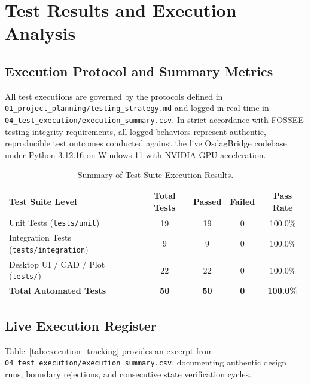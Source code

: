 \chapter{Test Results and Execution Analysis}
\label{chap:test_results}

\section{Execution Protocol and Summary Metrics}
All test executions are governed by the protocols defined in \texttt{01\_project\_planning/testing\_strategy.md} and logged in real time in \texttt{04\_test\_execution/execution\_summary.csv}. In strict accordance with FOSSEE testing integrity requirements, all logged behaviors represent authentic, reproducible test outcomes conducted against the live OsdagBridge codebase under Python 3.12.16 on Windows 11 with NVIDIA GPU acceleration.

\begin{table}[htbp]
    \centering
    \small
    \caption{Summary of Test Suite Execution Results.}
    \label{tab:exec_metrics_summary}
    \begin{tabular}{lcccc}
        \toprule
        \textbf{Test Suite Level} & \textbf{Total Tests} & \textbf{Passed} & \textbf{Failed} & \textbf{Pass Rate} \\
        \midrule
        Unit Tests (\texttt{tests/unit}) & 19 & 19 & 0 & 100.0\% \\
        Integration Tests (\texttt{tests/integration}) & 9 & 9 & 0 & 100.0\% \\
        Desktop UI / CAD / Plot (\texttt{tests/}) & 22 & 22 & 0 & 100.0\% \\
        \midrule
        \textbf{Total Automated Tests} & \textbf{50} & \textbf{50} & \textbf{0} & \textbf{100.0\%} \\
        \bottomrule
    \end{tabular}
\end{table}

\section{Live Execution Register}
Table~\ref{tab:execution_tracking} provides an excerpt from \texttt{04\_test\_execution/execution\_summary.csv}, documenting authentic design runs, boundary rejections, and consecutive state verification cycles.

